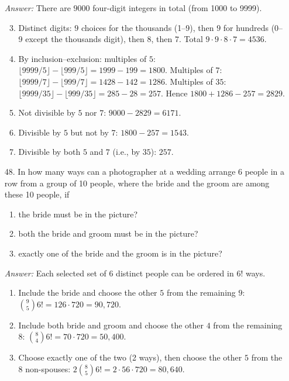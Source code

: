 \documentclass[11pt]{article}
\begin{document}
\begin{itemize}
    \medskip\textit{Answer:}
    There are $9000$ four-digit integers in total (from 1000 to 9999).
    \begin{enumerate}[label=(\alph*)]
        \setcounter{enumi}{2}
        \item Distinct digits: $9$ choices for the thousands (1--9), then $9$ for hundreds (0--9 except the thousands digit), then $8$, then $7$. Total $9\cdot9\cdot8\cdot7=4536$.
        \setcounter{enumi}{4}
        \item By inclusion–exclusion: multiples of $5$: $\lfloor 9999/5 \rfloor-\lfloor 999/5 \rfloor = 1999-199=1800$. Multiples of $7$: $\lfloor 9999/7 \rfloor-\lfloor 999/7 \rfloor = 1428-142=1286$. Multiples of $35$: $\lfloor 9999/35 \rfloor-\lfloor 999/35 \rfloor = 285-28=257$. Hence $1800+1286-257=2829$.
        \item Not divisible by $5$ nor $7$: $9000-2829=6171$.
        \item Divisible by $5$ but not by $7$: $1800-257=1543$.
        \item Divisible by both $5$ and $7$ (i.e., by $35$): $257$.
    \end{enumerate}

    \item[48.] In how many ways can a photographer at a wedding arrange 6 people in a row from a group of 10 people, where the bride and the groom are among these 10 people, if
    \begin{enumerate}[label=(\alph*)]
        \item the bride must be in the picture?
        \item both the bride and groom must be in the picture?
        \item exactly one of the bride and the groom is in the picture?
    \end{enumerate}

    \medskip\textit{Answer:}
    Each selected set of 6 distinct people can be ordered in $6!$ ways.
    \begin{enumerate}[label=(\alph*)]
        \item Include the bride and choose the other $5$ from the remaining $9$: $\binom{9}{5}6! = 126\cdot720 = 90{,}720$.
        \item Include both bride and groom and choose the other $4$ from the remaining $8$: $\binom{8}{4}6! = 70\cdot720 = 50{,}400$.
        \item Choose exactly one of the two (2 ways), then choose the other $5$ from the $8$ non-spouses: $2\binom{8}{5}6! = 2\cdot56\cdot720 = 80{,}640$.
    \end{enumerate}


\end{itemize}
\end{document}
